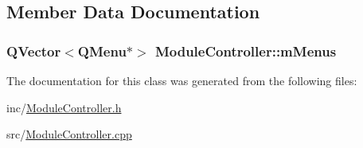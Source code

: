 \subsection{Member Data Documentation}
\hypertarget{class_module_controller_a4931a6eb2fb04603bee99760b3a71ecb}{
\subsubsection[{m\+Menus}]{\setlength{\rightskip}{0pt plus 5cm}Q\+Vector$<$Q\+Menu$\ast$$>$ Module\+Controller\+::m\+Menus\hspace{0.3cm}{\ttfamily [protected]}}}\label{class_module_controller_a4931a6eb2fb04603bee99760b3a71ecb}


The documentation for this class was generated from the following files\+:\begin{DoxyCompactItemize}
\item 
inc/\hyperlink{_module_controller_8h}{Module\+Controller.\+h}\item 
src/\hyperlink{_module_controller_8cpp}{Module\+Controller.\+cpp}\end{DoxyCompactItemize}
